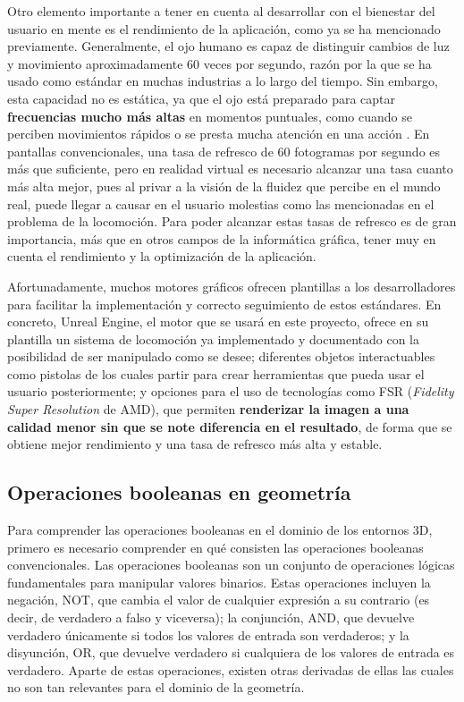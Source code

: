Otro elemento importante a tener en cuenta al desarrollar con el bienestar del usuario en mente es el rendimiento de la aplicación, como ya se ha mencionado previamente. Generalmente, el ojo humano es capaz de distinguir cambios de luz y movimiento aproximadamente 60 veces por segundo, razón por la que se ha usado como estándar en muchas industrias a lo largo del tiempo. Sin embargo, esta capacidad no es estática, ya que el ojo está preparado para captar \textbf{frecuencias mucho más altas} en momentos puntuales, como cuando se perciben movimientos rápidos o se presta mucha atención en una acción \cite{refresh_rate}. En pantallas convencionales, una tasa de refresco de 60 fotogramas por segundo es más que suficiente, pero en realidad virtual es necesario alcanzar una tasa cuanto más alta mejor, pues al privar a la visión de la fluidez que percibe en el mundo real, puede llegar a causar en el usuario molestias como las mencionadas en el problema de la locomoción. Para poder alcanzar estas tasas de refresco es de gran importancia, más que en otros campos de la informática gráfica, tener muy en cuenta el rendimiento y la optimización de la aplicación.

Afortunadamente, muchos motores gráficos ofrecen plantillas a los desarrolladores para facilitar la implementación y correcto seguimiento de estos estándares. En concreto, Unreal Engine, el motor que se usará en este proyecto, ofrece en su plantilla un sistema de locomoción ya implementado y documentado con la posibilidad de ser manipulado como se desee; diferentes objetos interactuables como pistolas de los cuales partir para crear herramientas que pueda usar el usuario posteriormente; y opciones para el uso de tecnologías como FSR (\textit{Fidelity Super Resolution} de AMD), que permiten \textbf{renderizar la imagen a una calidad menor sin que se note diferencia en el resultado}, de forma que se obtiene mejor rendimiento y una tasa de refresco más alta y estable.

\subsection{Operaciones booleanas en geometría}

Para comprender las operaciones booleanas en el dominio de los entornos 3D, primero es necesario comprender en qué consisten las operaciones booleanas convencionales. Las operaciones booleanas son un conjunto de operaciones lógicas fundamentales para manipular valores binarios. Estas operaciones incluyen la negación, NOT, que cambia el valor de cualquier expresión a su contrario (es decir, de verdadero a falso y viceversa); la conjunción, AND, que devuelve verdadero únicamente si todos los valores de entrada son verdaderos; y la disyunción, OR, que devuelve verdadero si cualquiera de los valores de entrada es verdadero. Aparte de estas operaciones, existen otras derivadas de ellas las cuales no son tan relevantes para el dominio de la geometría.

